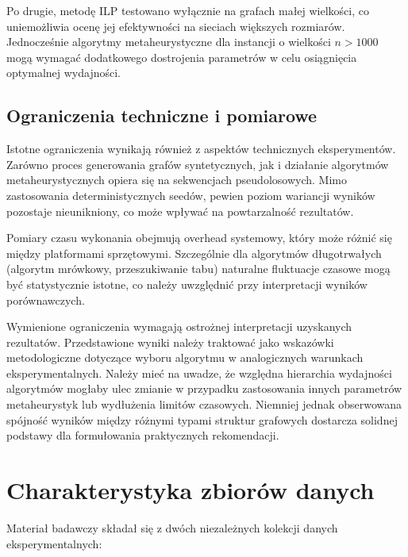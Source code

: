 Po drugie, metodę ILP testowano wyłącznie na grafach małej wielkości, co uniemożliwia ocenę jej efektywności na sieciach większych rozmiarów. Jednocześnie algorytmy metaheurystyczne dla instancji o wielkości $n > 1000$ mogą wymagać dodatkowego dostrojenia parametrów w celu osiągnięcia optymalnej wydajności.

\subsection{Ograniczenia techniczne i pomiarowe}

Istotne ograniczenia wynikają również z aspektów technicznych eksperymentów. Zarówno proces generowania grafów syntetycznych, jak i działanie algorytmów metaheurystycznych opiera się na sekwencjach pseudolosowych. Mimo zastosowania deterministycznych seedów, pewien poziom wariancji wyników pozostaje nieunikniony, co może wpływać na powtarzalność rezultatów.

Pomiary czasu wykonania obejmują overhead systemowy, który może różnić się między platformami sprzętowymi. Szczególnie dla algorytmów długotrwałych (algorytm mrówkowy, przeszukiwanie tabu) naturalne fluktuacje czasowe mogą być statystycznie istotne, co należy uwzględnić przy interpretacji wyników porównawczych.

Wymienione ograniczenia wymagają ostrożnej interpretacji uzyskanych rezultatów. Przedstawione wyniki należy traktować jako wskazówki metodologiczne dotyczące wyboru algorytmu w analogicznych warunkach eksperymentalnych. Należy mieć na uwadze, że względna hierarchia wydajności algorytmów mogłaby ulec zmianie w przypadku zastosowania innych parametrów metaheurystyk lub wydłużenia limitów czasowych. Niemniej jednak obserwowana spójność wyników między różnymi typami struktur grafowych dostarcza solidnej podstawy dla formułowania praktycznych rekomendacji.

\section{Charakterystyka zbiorów danych}

Materiał badawczy składał się z dwóch niezależnych kolekcji danych eksperymentalnych:

